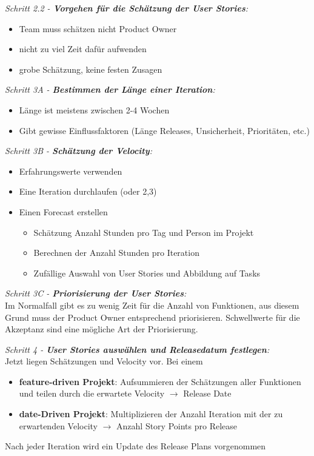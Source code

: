 \documentclass{report}
\theoremstyle{definition}
\theoremstyle{example}
\begin{document}
\textit{Schritt 2.2 - \textbf{Vorgehen für die Schätzung der User Stories}:}\\
\begin{itemize}
	\item Team muss schätzen nicht Product Owner
	\item nicht zu viel Zeit dafür aufwenden
	\item grobe Schätzung, keine festen Zusagen
\end{itemize}

\textit{Schritt 3A - \textbf{Bestimmen der Länge einer Iteration}:}\\
\begin{itemize}
	\item Länge ist meistens zwischen 2-4 Wochen
	\item Gibt gewisse Einflussfaktoren (Länge Releases, Unsicherheit, Prioritäten, etc.)
\end{itemize}

\textit{Schritt 3B - \textbf{Schätzung der Velocity}:}\\
\begin{itemize}
	\item Erfahrungswerte verwenden
	\item Eine Iteration durchlaufen (oder 2,3)
	\item {Einen Forecast erstellen
	\begin{itemize}
		\item Schätzung Anzahl Stunden pro Tag und Person im Projekt
		\item Berechnen der Anzahl Stunden pro Iteration
		\item Zufällige Auswahl von User Stories und Abbildung auf Tasks
	\end{itemize}
	}
\end{itemize}

\textit{Schritt 3C - \textbf{Priorisierung der User Stories}:}\\
Im Normalfall gibt es zu wenig Zeit für die Anzahl von Funktionen, aus diesem Grund muss der Product Owner entsprechend priorisieren. Schwellwerte für die Akzeptanz sind eine mögliche Art der Priorisierung.

\textit{Schritt 4 - \textbf{User Stories auswählen und Releasedatum festlegen}:}\\
Jetzt liegen Schätzungen und Velocity vor. Bei einem
\begin{itemize}
	\item \textbf{feature-driven Projekt}: Aufsummieren der Schätzungen aller Funktionen und teilen durch die erwartete Velocity $\rightarrow$ Release Date
	\item \textbf{date-Driven Projekt}: Multiplizieren der Anzahl Iteration mit der zu erwartenden Velocity $\rightarrow$ Anzahl Story Points pro Release
\end{itemize}
Nach jeder Iteration wird ein Update des Release Plans vorgenommen
\end{document}
